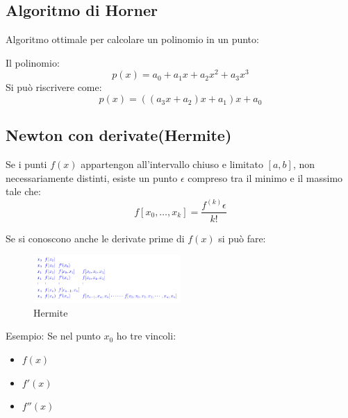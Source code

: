 \subsection{Algoritmo di Horner}
Algoritmo ottimale per calcolare un polinomio in un punto:

Il polinomio:
\begin{equation}
  p(x) = a_0 + a_1x + a_2x^2 + a_3x^3
\end{equation}
Si può riscrivere come:
\begin{equation}
  p(x) = ((a_3x + a_2)x + a_1)x + a_0
\end{equation}


\subsection{Newton con derivate(Hermite)}
Se i punti $f(x)$ appartengon all'intervallo chiuso e limitato $[a, b]$, non necessariamente distinti,
esiste un punto $\epsilon$ compreso tra il minimo e il massimo tale che:
\begin{equation}
  f[x_0, \dots, x_k] = \displaystyle\frac{f^{(k)}\epsilon}{k!}
\end{equation}


Se si conoscono anche le derivate prime di $f(x)$ si può fare:

\begin{figure}[h!]
  \begin{center}
    \includegraphics[width=0.5\textwidth]{./images/hermite.png}
  \end{center}
  \caption{Hermite}
  \label{fig:hermite}
\end{figure}



Esempio:
Se nel punto $x_0$ ho tre vincoli:
\begin{itemize}
  \item $f(x)$
  \item $f'(x)$
  \item $f''(x)$
\end{itemize}

